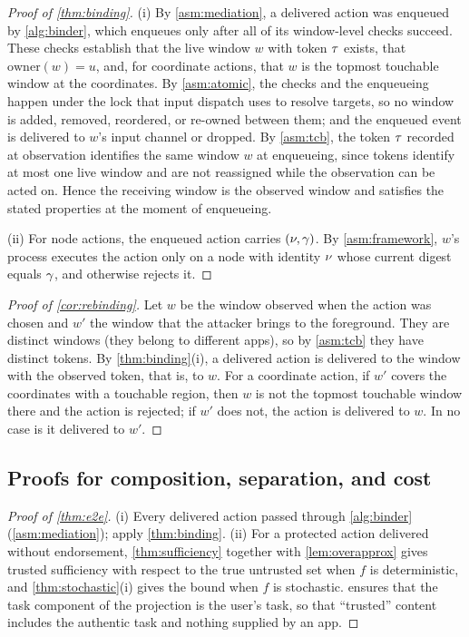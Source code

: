 \begin{proof}[Proof of \cref{thm:binding}]
(i) By \cref{asm:mediation}, a delivered action was enqueued by \cref{alg:binder}, which enqueues only after all of its window-level checks succeed. These checks establish that the live window $w$ with token $\tau$ exists, that $\mathrm{owner}(w)=u$, and, for coordinate actions, that $w$ is the topmost touchable window at the coordinates. By \cref{asm:atomic}, the checks and the enqueueing happen under the lock that input dispatch uses to resolve targets, so no window is added, removed, reordered, or re-owned between them; and the enqueued event is delivered to $w$'s input channel or dropped. By \cref{asm:tcb}, the token $\tau$ recorded at observation identifies the same window $w$ at enqueueing, since tokens identify at most one live window and are not reassigned while the observation can be acted on. Hence the receiving window is the observed window and satisfies the stated properties at the moment of enqueueing.

(ii) For node actions, the enqueued action carries $(\nu,\gamma)$. By \cref{asm:framework}, $w$'s process executes the action only on a node with identity $\nu$ whose current digest equals $\gamma$, and otherwise rejects it.
\end{proof}

\begin{proof}[Proof of \cref{cor:rebinding}]
Let $w$ be the window observed when the action was chosen and $w'$ the window that the attacker brings to the foreground. They are distinct windows (they belong to different apps), so by \cref{asm:tcb} they have distinct tokens. By \cref{thm:binding}(i), a delivered action is delivered to the window with the observed token, that is, to $w$. For a coordinate action, if $w'$ covers the coordinates with a touchable region, then $w$ is not the topmost touchable window there and the action is rejected; if $w'$ does not, the action is delivered to $w$. In no case is it delivered to $w'$.
\end{proof}

\subsection{Proofs for composition, separation, and cost}

\begin{proof}[Proof of \cref{thm:e2e}]
(i) Every delivered action passed through \cref{alg:binder} (\cref{asm:mediation}); apply \cref{thm:binding}. (ii) For a protected action delivered without endorsement, \cref{thm:sufficiency} together with \cref{lem:overapprox} gives trusted sufficiency with respect to the true untrusted set when $f$ is deterministic, and \cref{thm:stochastic}(i) gives the bound when $f$ is stochastic.  ensures that the task component of the projection is the user's task, so that ``trusted'' content includes the authentic task and nothing supplied by an app.
\end{proof}

